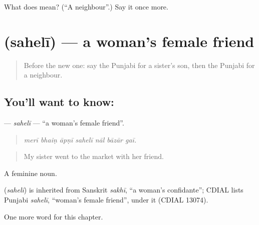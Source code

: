 \begin{tcolorbox}[breakable,colback=teal!4,colframe=teal!35!black,title={Before you move on}]
What does  mean? (\textquotedblleft{}A neighbour\textquotedblright{}.) Say it once more.
\end{tcolorbox}
\section[\texorpdfstring{\pa{ਸਹੇਲੀ} (sahelī)}{ਸਹੇਲੀ (sahelī)}]{ (sahelī) — a woman's female friend}

\label{lesson:PA-C332-saheli}



\begin{quote}
Before the new one: say the Punjabi for a sister's son, then the Punjabi for a neighbour.
\end{quote}

\subsection*{You'll want to know: }
\textbf{} — \emph{sahelī} — \textquotedblleft{}a woman's female friend\textquotedblright{}.

\begin{quote}
      
\end{quote}

\begin{quote}
\emph{merī bhaiṇ āpṇī sahelī nāl bāzār gaī.}
\end{quote}

\begin{quote}
My sister went to the market with her friend.
\end{quote}

A feminine noun.

\begin{cousinweb}
\textbf{} (\emph{sahelī}) is inherited from Sanskrit \emph{sakhī}, \textquotedblleft{}a woman's confidante\textquotedblright{}; CDIAL lists Punjabi \emph{sahelī}, \textquotedblleft{}woman's female friend\textquotedblright{}, under it (CDIAL 13074).
\end{cousinweb}

\begin{grammarlens}[title={What you've built}]
One more word for this chapter.
\end{grammarlens}

